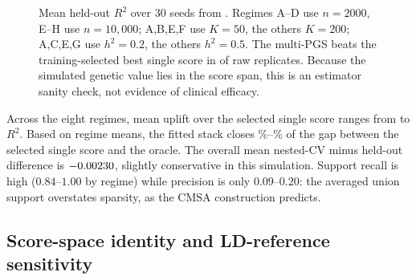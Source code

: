 \documentclass[11pt,a4paper]{article}
\newcommand{\Rtwo}{\(R^2\)}
\begin{document}
\begin{figure}[ht]
\centering
{}
\caption{Mean held-out \Rtwo{} over 30 seeds from
\protect{}.
Regimes A--D use \(n=2000\), E--H use \(n=10{,}000\); A,B,E,F
use \(K=50\), the others \(K=200\); A,C,E,G use \(h^2=0.2\),
the others \(h^2=0.5\). The multi-PGS beats the
training-selected best single score in \ReportFitWins{} of
\ReportFitReplicates{} raw replicates. Because the simulated
genetic value lies in the score span, this is an estimator
sanity check, not evidence of clinical efficacy.}
\label{fig:fit-accuracy}
\end{figure}

Across the eight regimes, mean uplift over the selected single
score ranges from \ReportFitUpliftMin{} to \ReportFitUpliftMax{}
\Rtwo{}. Based on regime means, the fitted stack closes
\ReportFitGapClosedMinPct\%--\ReportFitGapClosedMaxPct\% of the
gap between the selected single score and the oracle. The
overall mean nested-CV minus held-out difference is
\(-0.00230\), slightly conservative in this
simulation. Support recall is high (\(0.84\)--\(1.00\) by
regime) while precision is only \(0.09\)--\(0.20\): the
averaged union support overstates sparsity, as the CMSA
construction predicts.

\subsection{Score-space identity and LD-reference sensitivity}
\label{sec:ld}
\end{document}
